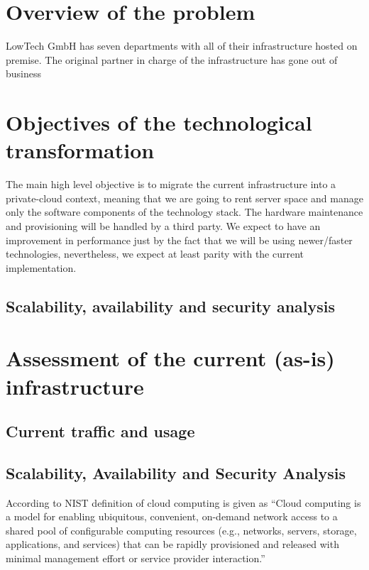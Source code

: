 \documentclass{llncs}
\begin{document}
\section{Overview of the problem}

LowTech GmbH has seven departments with all of their infrastructure hosted on premise. The original partner in charge of the infrastructure has gone out of business


\section{Objectives of the technological transformation}

The main high level objective is to migrate the current infrastructure into a private-cloud context, meaning that we are going to rent server space and manage only the software components of the technology stack. The hardware maintenance and provisioning will be handled by a third party. We expect to have an improvement in performance just by the fact that we will be using newer/faster technologies, nevertheless, we expect at least parity with the current implementation. 

\subsection{Scalability, availability and security analysis}

\section{Assessment of the current (as-is) infrastructure}

\subsection{Current traffic and usage}

\subsection{Scalability, Availability and Security Analysis}
According to NIST definition of cloud computing is given as ``Cloud computing is a model for enabling ubiquitous, convenient, on-demand network access to a shared
pool of configurable computing resources (e.g., networks, servers, storage, applications, and services) that
can be rapidly provisioned and released with minimal management effort or service provider interaction.'' \cite{mell2011nist}
\end{document}
